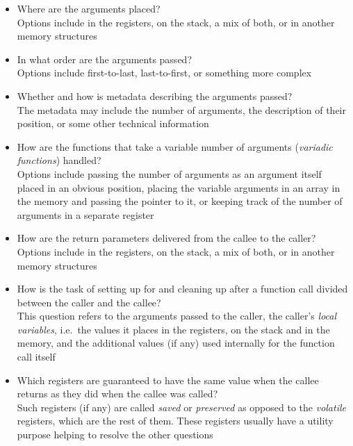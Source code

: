 \begin{itemize}
    \item Where are the arguments placed? \\
    Options include in the registers, on the stack, a mix of both,
    or in another memory structures

    \item In what order are the arguments passed? \\
    Options include first-to-last, last-to-first, or something more complex

    \item Whether and how is metadata describing the arguments passed? \\
    The metadata may include the number of arguments, the description
    of their position, or some other technical information

    \item How are the functions that take a variable number of arguments
    (\textit{variadic functions}) handled? \\
    Options include passing the number of arguments as an argument
    itself placed in an obvious position, placing the variable arguments
    in an array in the memory and passing the pointer to it, or keeping
    track of the number of arguments in a separate register

    \item How are the return parameters delivered from the callee to
    the caller? \\
    Options include in the registers, on the stack, a mix of both,
    or in another memory structures

    \item How is the task of setting up for and cleaning up after
    a function call divided between the caller and the callee? \\
    This question refers to the arguments passed to the caller,
    the caller's \textit{local variables}, i.e.\ the values it places
    in the registers, on the stack and in the memory, and the additional
    values (if any) used internally for the function call itself

    \item Which registers are guaranteed to have the same value
    when the callee returns as they did when the callee was called? \\
    Such registers (if any) are called \textit{saved} or \textit{preserved}
    as opposed to the \textit{volatile} registers, which are the rest of them.
    These registers usually have a utility purpose helping to resolve the other
    questions
\end{itemize}

